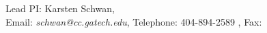 \begin{center}
Lead PI: Karsten Schwan, \GATECH\\
Email: \emph{schwan@cc.gatech.edu}, Telephone: 404-894-2589 , Fax: 
\end{center}